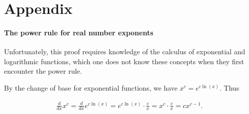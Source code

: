 \part*{Appendix}

\subsection*{The power rule for real number exponents}

Unfortunately, this proof requires knowledge of the calculus of exponential and logarithmic functions, which one does not know these concepts when they first encounter the power rule.

By the change of base for exponential functions, we have $x^c = e^{c\ln(x)}$. Thus

\begin{align*}
    \frac{d}{dx} x^c = \frac{d}{dx} e^{c\ln(x)} = e^{c\ln(x)} \cdot \frac{c}{x} = x^c \cdot \frac{c}{x} = cx^{c - 1}.
\end{align*}

